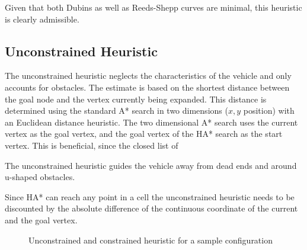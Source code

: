 Given that both Dubins as well as Reeds-Shepp curves are minimal, this heuristic is clearly admissible.

\subsection{Unconstrained Heuristic}
The unconstrained heuristic neglects the characteristics of the vehicle and only accounts for obstacles. The estimate is based on the shortest distance between the goal node and the vertex currently being expanded. This distance is determined using the standard A* search in two dimensions ($x,y$ position) with an Euclidean distance heuristic.
The two dimensional A* search uses the current vertex as the goal vertex, and the goal vertex of the HA* search as the start vertex. This is beneficial, since the closed list of 

The unconstrained heuristic guides the vehicle away from dead ends and around u-shaped obstacles.

Since HA* can reach any point in a cell the unconstrained heuristic needs to be discounted by the absolute difference of the continuous coordinate of the current and the goal vertex.

\begin{figure}[h]
    \caption{Unconstrained and constrained heuristic for a sample configuration}
    \label{fig:heuristicComparison}
\end{figure}